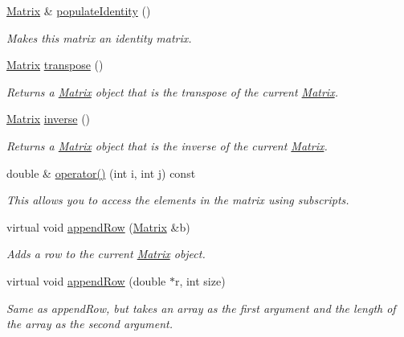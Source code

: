 \begin{DoxyCompactItemize}
\hyperlink{class_matrix}{Matrix} \& \hyperlink{class_matrix_a0ee71091770a4e83e54860f291ef1b7d}{populateIdentity} ()
\begin{DoxyCompactList}\small\item\em Makes this matrix an identity matrix. \item\end{DoxyCompactList}\item 
\hyperlink{class_matrix}{Matrix} \hyperlink{class_matrix_ae23f817021383e3c8636a714dcba1d21}{transpose} ()
\begin{DoxyCompactList}\small\item\em Returns a \hyperlink{class_matrix}{Matrix} object that is the transpose of the current \hyperlink{class_matrix}{Matrix}. \item\end{DoxyCompactList}\item 
\hyperlink{class_matrix}{Matrix} \hyperlink{class_matrix_ac4f5e7d4bb1bfd6586bd3384bd2a02b0}{inverse} ()
\begin{DoxyCompactList}\small\item\em Returns a \hyperlink{class_matrix}{Matrix} object that is the inverse of the current \hyperlink{class_matrix}{Matrix}. \item\end{DoxyCompactList}\item 
double \& \hyperlink{class_matrix_a3d361fded5f8992d2202894ca141eb72}{operator()} (int i, int j) const 
\begin{DoxyCompactList}\small\item\em This allows you to access the elements in the matrix using subscripts. \item\end{DoxyCompactList}\item 
virtual void \hyperlink{class_matrix_a20c175983a6b23a83fccfe8f726b3b07}{appendRow} (\hyperlink{class_matrix}{Matrix} \&b)
\begin{DoxyCompactList}\small\item\em Adds a row to the current \hyperlink{class_matrix}{Matrix} object. \item\end{DoxyCompactList}\item 
virtual void \hyperlink{class_matrix_a55104cb3fcf93a887ac713955fc0f5c9}{appendRow} (double $\ast$r, int size)
\begin{DoxyCompactList}\small\item\em Same as appendRow, but takes an array as the first argument and the length of the array as the second argument. \item\end{DoxyCompactList}\item 

\end{DoxyCompactItemize}
